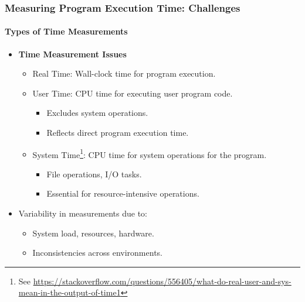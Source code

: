 \documentclass[compress,12pt]{beamer}
\begin{document}
\begin{frame}
    \frametitle{Measuring Program Execution Time: Challenges}
    \framesubtitle{Types of Time Measurements}

    \begin{itemize}
        \item \textbf{Time Measurement Issues}
              \begin{itemize}
                  \item Real Time: Wall-clock time for program execution.
                  \item User Time: CPU time for executing user program code.
                        \begin{itemize}
                            \item Excludes system operations.
                            \item Reflects direct program execution time.
                        \end{itemize}
                  \item System Time\footnote{See \url{https://stackoverflow.com/questions/556405/what-do-real-user-and-sys-mean-in-the-output-of-time1}}: CPU time for system operations for the program.
                        \begin{itemize}
                            \item File operations, I/O tasks.
                            \item Essential for resource-intensive operations.
                        \end{itemize}
              \end{itemize}
        \item Variability in measurements due to:
              \begin{itemize}
                  \item System load, resources, hardware.
                  \item Inconsistencies across environments.
              \end{itemize}
    \end{itemize}
\end{frame}
\end{document}
